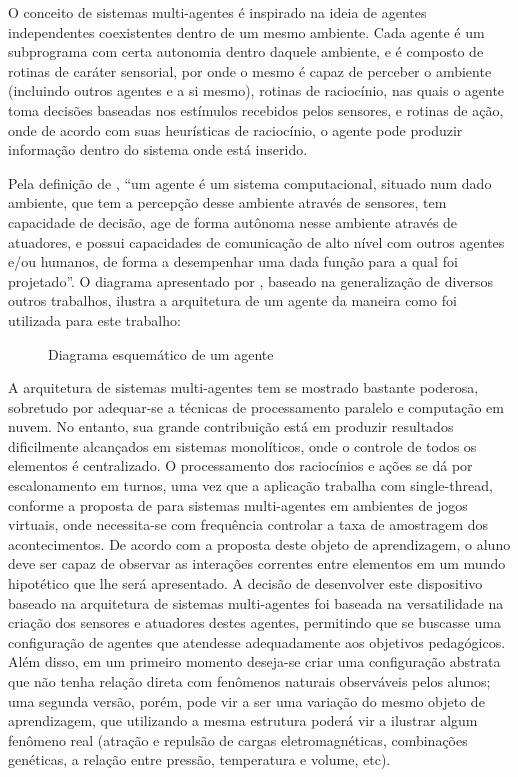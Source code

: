 \documentclass{article}
\begin{document}
O conceito de sistemas multi-agentes é inspirado na ideia de agentes independentes
coexistentes dentro de um mesmo ambiente. Cada agente é um subprograma com
certa autonomia dentro daquele ambiente, e é composto de rotinas de caráter sensorial,
por onde o mesmo é capaz de perceber o ambiente (incluindo outros agentes e a si
mesmo), rotinas de raciocínio, nas quais o agente toma decisões baseadas nos estímulos
recebidos pelos sensores, e rotinas de ação, onde de acordo com suas heurísticas de
raciocínio, o agente pode produzir informação dentro do sistema onde está inserido.

Pela definição de \cite{reis-2002}, ``um agente é um sistema computacional, situado
num dado ambiente, que tem a percepção desse ambiente através de sensores, tem
capacidade de decisão, age de forma autônoma nesse ambiente através de atuadores, e
possui capacidades de comunicação de alto nível com outros agentes e/ou humanos, de
forma a desempenhar uma dada função para a qual foi projetado''. O diagrama
apresentado por \cite{Thomaz-2011}, baseado na generalização de diversos outros trabalhos,
ilustra a arquitetura de um agente da maneira como foi utilizada para este trabalho:

\begin{figure}
	\centering
	\caption{Diagrama esquemático de um agente}
	\label{fig:mas}
\end{figure}

A arquitetura de sistemas multi-agentes tem se mostrado bastante poderosa,
sobretudo por adequar-se a técnicas de processamento paralelo e computação em nuvem.
No entanto, sua grande contribuição está em produzir resultados dificilmente
alcançados em sistemas monolíticos, onde o controle de todos os elementos é
centralizado. O processamento dos raciocínios e ações se dá por escalonamento em
turnos, uma vez que a aplicação trabalha com single-thread, conforme a proposta de
\cite{behrens-2010} para sistemas multi-agentes em ambientes de jogos virtuais, onde necessita-se
com frequência controlar a taxa de amostragem dos acontecimentos.
De acordo com a proposta deste objeto de aprendizagem, o aluno deve ser capaz
de observar as interações correntes entre elementos em um mundo hipotético que lhe
será apresentado. A decisão de desenvolver este dispositivo baseado na arquitetura de
sistemas multi-agentes foi baseada na versatilidade na criação dos sensores e atuadores
destes agentes, permitindo que se buscasse uma configuração de agentes que atendesse
adequadamente aos objetivos pedagógicos. Além disso, em um primeiro momento
deseja-se criar uma configuração abstrata que não tenha relação direta com fenômenos
naturais observáveis pelos alunos; uma segunda versão, porém, pode vir a ser uma
variação do mesmo objeto de aprendizagem, que utilizando a mesma estrutura poderá
vir a ilustrar algum fenômeno real (atração e repulsão de cargas eletromagnéticas,
combinações genéticas, a relação entre pressão, temperatura e volume, etc).
\end{document}
